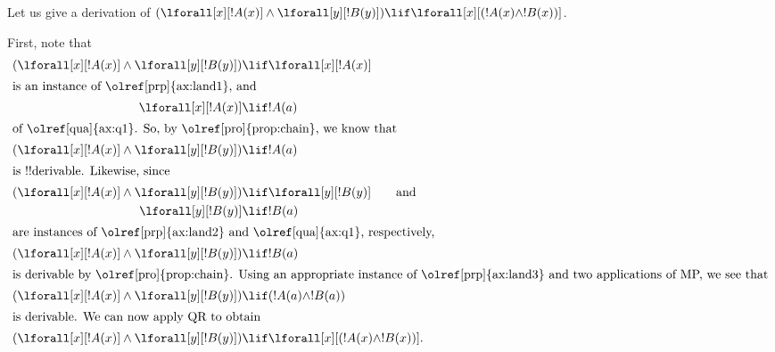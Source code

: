 \documentclass[../../../include/open-logic-section]{subfiles}
\begin{document}


\begin{ex}
Let us give a derivation of $(\lforall[x][!A(x)] \land
\lforall[y][!B(y)]) \lif \lforall[x][(!A(x) \land !B(x))]$.

First, note that
\begin{align*}
  (\lforall[x][!A(x)] \land \lforall[y][!B(y)]) & \lif \lforall[x][!A(x)]\\
  \intertext{is an instance of \olref[prp]{ax:land1}, and}
  \lforall[x][!A(x)] & \lif !A(a) \\
  \intertext{of \olref[qua]{ax:q1}. So, by \olref[pro]{prop:chain}, we know that}
  (\lforall[x][!A(x)] \land \lforall[y][!B(y)]) & \lif !A(a) \\
  \intertext{is !!{derivable}. Likewise, since}
  (\lforall[x][!A(x)] \land \lforall[y][!B(y)]) & \lif \lforall[y][!B(y)] \qquad\text{and}\\
    \lforall[y][!B(y)] & \lif !B(a)\\
    \intertext{are instances of \olref[prp]{ax:land2} and \olref[qua]{ax:q1}, respectively,}
    (\lforall[x][!A(x)] \land \lforall[y][!B(y)]) & \lif !B(a)\\
    \intertext{is derivable by \olref[pro]{prop:chain}. Using an appropriate instance of \olref[prp]{ax:land3} and two applications of~MP, we see that}
    (\lforall[x][!A(x)] \land \lforall[y][!B(y)]) & \lif (!A(a) \land !B(a))\\
    \intertext{is derivable. We can now apply QR to obtain}
(\lforall[x][!A(x)] \land \lforall[y][!B(y)]) & \lif \lforall[x][(!A(x) \land !B(x))].
\end{align*}
\end{ex}
\end{document}
